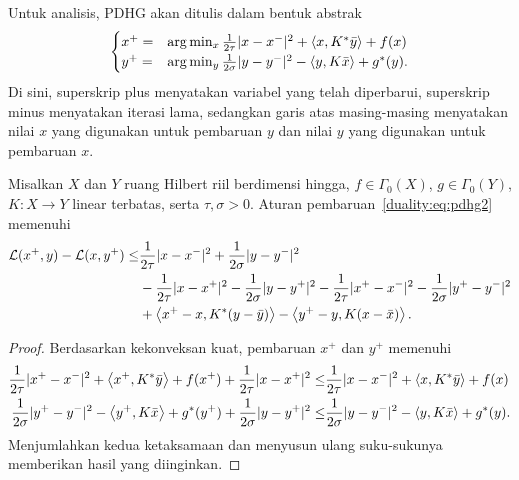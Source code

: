 Untuk analisis, PDHG akan ditulis dalam bentuk abstrak
\begin{equation}\label{duality:eq:pdhg2}
    \begin{cases}
        x^+ =& \arg\min_x \frac{1}{2\tau}|x-x^-|^2 + \left\langle x , K^*\bar y\right\rangle + f(x)\\
        y^+ =& \arg\min_y \frac{1}{2\sigma}|y-y^-|^2 - \left\langle y , K\bar x\right\rangle + g^*(y).
    \end{cases}
\end{equation}
Di sini, superskrip plus menyatakan variabel yang telah diperbarui, superskrip minus menyatakan iterasi lama, sedangkan garis atas masing-masing menyatakan nilai $x$ yang digunakan untuk pembaruan $y$ dan nilai $y$ yang digunakan untuk pembaruan $x$.
\begin{lemma}
    Misalkan $X$ dan $Y$ ruang Hilbert riil berdimensi hingga, $f\in\Gamma_0(X)$, $g\in\Gamma_0(Y)$, $K:X\rightarrow Y$ linear terbatas, serta $\tau,\sigma>0$. Aturan pembaruan~\eqref{duality:eq:pdhg2} memenuhi
    \begin{equation}
        \begin{aligned}
            \mathcal{L}(x^+,y) - \mathcal{L}(x,y^+)\leq& \frac{1}{2\tau}|x-x^-|^2 + \frac{1}{2\sigma}|y-y^-|^2\\
            &-\frac{1}{2\tau}|x-x^+|^2 - \frac{1}{2\sigma}|y-y^+|^2
            -\frac{1}{2\tau}|x^+-x^-|^2 - \frac{1}{2\sigma}|y^+-y^-|^2\\
            &+\left\langle x^+-x , K^*(y-\bar{y})\right\rangle  - \left\langle y^+-y , K(x-\bar{x})\right\rangle.
        \end{aligned}
    \end{equation}
\end{lemma}
\begin{proof}
    Berdasarkan kekonveksan kuat, pembaruan $x^+$ dan $y^+$ memenuhi
    \begin{equation}
        \begin{aligned}
            \frac{1}{2\tau}|x^+-x^-|^2 + \left\langle x^+ , K^*\bar y\right\rangle + f(x^+) + \frac{1}{2\tau}|x-x^+|^2
            \leq& \frac{1}{2\tau}|x-x^-|^2 + \left\langle x , K^*\bar y\right\rangle + f(x)\\
            \frac{1}{2\sigma}|y^+-y^-|^2 - \left\langle y^+ , K\bar x\right\rangle + g^*(y^+) + \frac{1}{2\sigma}|y-y^+|^2
            \leq& \frac{1}{2\sigma}|y-y^-|^2 - \left\langle y , K\bar x\right\rangle + g^*(y).
        \end{aligned}
    \end{equation}
    Menjumlahkan kedua ketaksamaan dan menyusun ulang suku-sukunya memberikan hasil yang diinginkan.
\end{proof}

